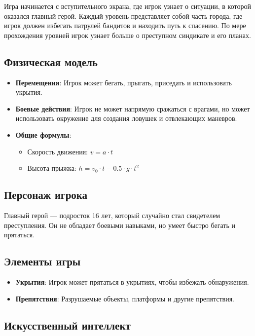 \documentclass[a4paper,12pt]{article}
\begin{document}
Игра начинается с вступительного экрана, где игрок узнает о ситуации, в которой оказался главный герой. Каждый уровень представляет собой часть города, где игрок должен избегать патрулей бандитов и находить путь к спасению. По мере прохождения уровней игрок узнает больше о преступном синдикате и его планах.

\subsection{Физическая модель}

\begin{itemize}
    \item \textbf{Перемещения}: Игрок может бегать, прыгать, приседать и использовать укрытия.
    \item \textbf{Боевые действия}: Игрок не может напрямую сражаться с врагами, но может использовать окружение для создания ловушек и отвлекающих маневров.
    \item \textbf{Общие формулы}:
    \begin{itemize}
        \item Скорость движения: \( v = a \cdot t \)
        \item Высота прыжка: \( h = v_0 \cdot t - 0.5 \cdot g \cdot t^2 \)
    \end{itemize}
\end{itemize}

\subsection{Персонаж игрока}

Главный герой — подросток 16 лет, который случайно стал свидетелем преступления. Он не обладает боевыми навыками, но умеет быстро бегать и прятаться.

\subsection{Элементы игры}

\begin{itemize}
    \item \textbf{Укрытия}: Игрок может прятаться в укрытиях, чтобы избежать обнаружения.
    \item \textbf{Препятствия}: Разрушаемые объекты, платформы и другие препятствия.
\end{itemize}

\subsection{Искусственный интеллект}
\end{document}
